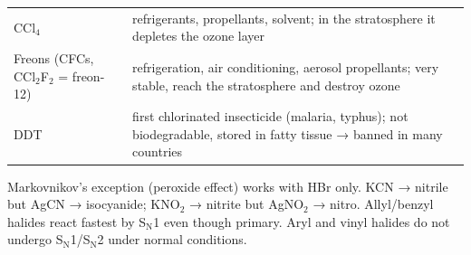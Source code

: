 \documentclass[9pt,a4paper]{extarticle}
\begin{document}
\begin{multicols}{2}
{\begin{tabularx}{\linewidth}{@{}l Y@{}}
CCl$_4$ & refrigerants, propellants, solvent; in the stratosphere it depletes the ozone layer\\
Freons (CFCs, CCl$_2$F$_2$ = freon-12) & refrigeration, air conditioning, aerosol propellants; very stable, reach the stratosphere and destroy ozone\\
DDT & first chlorinated insecticide (malaria, typhus); not biodegradable, stored in fatty tissue → banned in many countries\\
\bottomrule
\end{tabularx}\par}
\begin{tip}\Tip Markovnikov's exception (peroxide effect) works with HBr only. KCN → nitrile but AgCN → isocyanide; KNO$_2$ → nitrite but AgNO$_2$ → nitro. Allyl/benzyl halides react fastest by S$_\text{N}$1 even though primary. Aryl and vinyl halides do not undergo S$_\text{N}$1/S$_\text{N}$2 under normal conditions.\end{tip}


\end{multicols}
\end{document}
